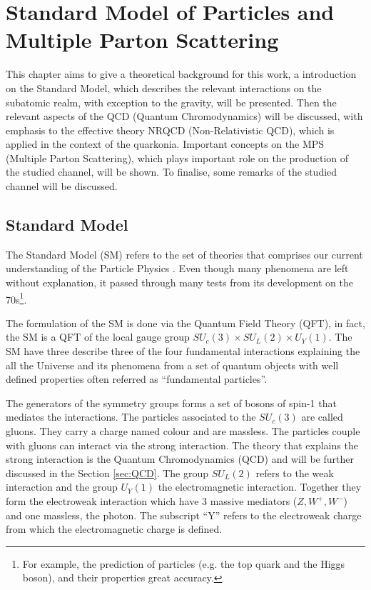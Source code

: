 \chapter{Standard Model of Particles and Multiple Parton Scattering}

This chapter aims to give a theoretical background for this work, a introduction on the Standard Model, which describes the relevant interactions on the subatomic realm, with exception to the gravity, will be presented. Then the relevant aspects of the QCD (Quantum Chromodynamics) will be discussed, with emphasis to the effective theory NRQCD (Non-Relativistic QCD), which is applied in the context of the quarkonia. Important concepts on the MPS (Multiple Parton Scattering), which plays important role on the production of the studied channel, will be shown. To finalise, some remarks of the studied channel will be discussed.

\section{Standard Model}

The Standard Model (SM) refers to the set of theories that comprises our current understanding of the Particle Physics \cite{Burgess:2006hbd, perkins_2000}. Even though many phenomena are left without explanation, it passed through many tests from its development on the 70s\footnote{For example, the prediction of particles (e.g. the top quark and the Higgs boson), and their properties great accuracy.}.

The formulation of the SM is done via the Quantum Field Theory (QFT), in fact, the SM is a QFT of the local gauge group $SU_c(3) \times SU_L(2) \times U_Y(1)$. The SM have three describe three of the four fundamental interactions explaining the all the Universe and its phenomena from a set of quantum objects with well defined properties often referred as ``fundamental particles''.

The generators of the symmetry groups forms a set of bosons of spin-1 that mediates the interactions. The particles associated to the $SU_c(3)$ are called gluons. They carry a charge named colour and are massless. The particles couple with gluons can interact via the strong interaction. The theory that explains the strong interaction is the Quantum Chromodynamics (QCD) and will be further discussed in the Section \ref{sec:QCD}. The group $SU_L(2)$ refers to the weak interaction and the group $U_Y(1)$ the electromagnetic interaction. Together they form the electroweak interaction which have 3 massive mediators ($Z, W^+, W^-$) and one massless, the photon. The subscript ``Y'' refers to the electroweak charge from which the electromagnetic charge is defined.

